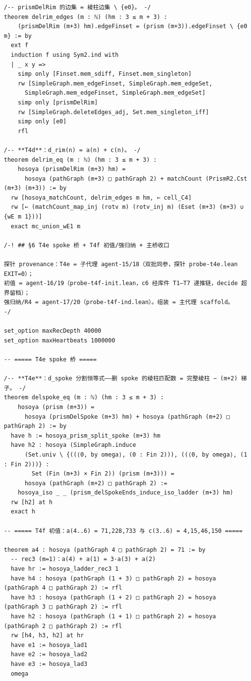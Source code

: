 \documentclass[11pt]{article}
\begin{document}
\begin{lstlisting}
/-- prismDelRim 的边集 = 棱柱边集 \ {e0}。 -/
theorem delrim_edges (m : ℕ) (hm : 3 ≤ m + 3) :
    (prismDelRim (m+3) hm).edgeFinset = (prism (m+3)).edgeFinset \ {e0 m} := by
  ext f
  induction f using Sym2.ind with
  | _ x y =>
    simp only [Finset.mem_sdiff, Finset.mem_singleton]
    rw [SimpleGraph.mem_edgeFinset, SimpleGraph.mem_edgeSet,
      SimpleGraph.mem_edgeFinset, SimpleGraph.mem_edgeSet]
    simp only [prismDelRim]
    rw [SimpleGraph.deleteEdges_adj, Set.mem_singleton_iff]
    simp only [e0]
    rfl

/-- **T4d**：d_rim(n) = a(n) + c(n)。 -/
theorem delrim_eq (m : ℕ) (hm : 3 ≤ m + 3) :
    hosoya (prismDelRim (m+3) hm) =
      hosoya (pathGraph (m+3) □ pathGraph 2) + matchCount (PrismR2.Cst (m+3) (m+3)) := by
  rw [hosoya_matchCount, delrim_edges m hm, ← cell_C4]
  rw [← (matchCount_map_inj (rotv m) (rotv_inj m) (Eset (m+3) (m+3) ∪ {wE m 1}))]
  exact mc_union_wE1 m

/-! ## §6 T4e spoke 桥 + T4f 初值/强归纳 + 主桥收口

探针 provenance：T4e = 子代理 agent-15/18（双批同参，探针 probe-t4e.lean EXIT=0）；
初值 = agent-16/19（probe-t4f-init.lean，c6 经库件 T1–T7 递推链，decide 超界留档）；
强归纳/R4 = agent-17/20（probe-t4f-ind.lean）。组装 = 主代理 scaffold。
-/

set_option maxRecDepth 40000
set_option maxHeartbeats 1000000

-- ===== T4e spoke 桥 =====

/-- **T4e**：d_spoke 分割恒等式——删 spoke 的棱柱匹配数 = 完整棱柱 − (m+2) 梯子。 -/
theorem delspoke_eq (m : ℕ) (hm : 3 ≤ m + 3) :
    hosoya (prism (m+3)) =
      hosoya (prismDelSpoke (m+3) hm) + hosoya (pathGraph (m+2) □ pathGraph 2) := by
  have h := hosoya_prism_split_spoke (m+3) hm
  have h2 : hosoya (SimpleGraph.induce
      (Set.univ \ {((⟨0, by omega⟩, (0 : Fin 2))), ((⟨0, by omega⟩, (1 : Fin 2)))} :
        Set (Fin (m+3) × Fin 2)) (prism (m+3))) =
      hosoya (pathGraph (m+2) □ pathGraph 2) :=
    hosoya_iso _ _ (prism_delSpokeEnds_induce_iso_ladder (m+3) hm)
  rw [h2] at h
  exact h

-- ===== T4f 初值：a(4..6) = 71,228,733 与 c(3..6) = 4,15,46,150 =====

theorem a4 : hosoya (pathGraph 4 □ pathGraph 2) = 71 := by
  -- rec3 (m=1)：a(4) + a(1) = 3·a(3) + a(2)
  have hr := hosoya_ladder_rec3 1
  have h4 : hosoya (pathGraph (1 + 3) □ pathGraph 2) = hosoya (pathGraph 4 □ pathGraph 2) := rfl
  have h3 : hosoya (pathGraph (1 + 2) □ pathGraph 2) = hosoya (pathGraph 3 □ pathGraph 2) := rfl
  have h2 : hosoya (pathGraph (1 + 1) □ pathGraph 2) = hosoya (pathGraph 2 □ pathGraph 2) := rfl
  rw [h4, h3, h2] at hr
  have e1 := hosoya_lad1
  have e2 := hosoya_lad2
  have e3 := hosoya_lad3
  omega


\end{lstlisting}
\end{document}
